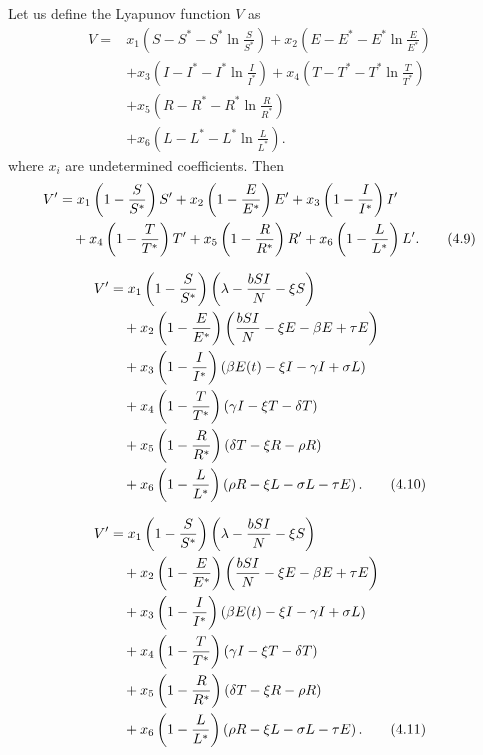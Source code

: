 \documentclass[10pt]{NSP1}
\begin{document}
Let us define the Lyapunov function $V$ as
\begin{equation}
\begin{aligned}
V ={}& x_1 \left( S - S^\ast - S^\ast \ln \frac{S}{S^\ast} \right)
      + x_2 \left( E - E^\ast - E^\ast \ln \frac{E}{E^\ast} \right) \\
& + x_3 \left( I - I^\ast - I^\ast \ln \frac{I}{I^\ast} \right)
  + x_4 \left( T - T^\ast - T^\ast \ln \frac{T}{T^\ast} \right) \\
& + x_5 \left( R - R^\ast - R^\ast \ln \frac{R}{R^\ast} \right) \\
& + x_6 \left( L - L^\ast - L^\ast \ln \frac{L}{L^\ast} \right).
\end{aligned}
\tag{4.8}
\end{equation}
where $x_i$ are undetermined coefficients. Then
\begin{align}
V' &= x_1 \left(1 - \frac{S}{S^*}\right) S' + x_2 \left(1 - \frac{E}{E^*}\right) E' + x_3 \left(1 - \frac{I}{I^*}\right) I' \notag \\
&\quad + x_4 \left(1 - \frac{T}{T^*}\right) T' + x_5 \left(1 - \frac{R}{R^*}\right) R' + x_6 \left(1 - \frac{L}{L^*}\right) L'.
\tag{4.9}
\end{align}

\begin{align}
V' &= x_1 \left(1 - \frac{S}{S^*}\right) \left( \lambda - \frac{b S I}{N} - \xi S \right) \notag \\
&\quad + x_2 \left(1 - \frac{E}{E^*}\right) \left( \frac{b S I}{N} - \xi E - \beta E + \tau E \right) \notag \\
&\quad + x_3 \left(1 - \frac{I}{I^*}\right) \left( \beta E(t) - \xi I - \gamma I + \sigma L \right) \notag \\
&\quad + x_4 \left(1 - \frac{T}{T^*}\right) \left( \gamma I - \xi T - \delta T \right) \notag \\
&\quad + x_5 \left(1 - \frac{R}{R^*}\right) \left( \delta T - \xi R - \rho R \right) \notag \\
&\quad + x_6 \left(1 - \frac{L}{L^*}\right) \left( \rho R - \xi L - \sigma L - \tau E \right).
\tag{4.10}
\end{align}

\begin{align}
V' &= x_1 \left(1 - \frac{S}{S^*}\right) \left( \lambda - \frac{b S I}{N} - \xi S \right) \notag \\
&\quad + x_2 \left(1 - \frac{E}{E^*}\right) \left( \frac{b S I}{N} - \xi E - \beta E + \tau E \right) \notag \\
&\quad + x_3 \left(1 - \frac{I}{I^*}\right) \left( \beta E(t) - \xi I - \gamma I + \sigma L \right) \notag \\
&\quad + x_4 \left(1 - \frac{T}{T^*}\right) \left( \gamma I - \xi T - \delta T \right) \notag \\
&\quad + x_5 \left(1 - \frac{R}{R^*}\right) \left( \delta T - \xi R - \rho R \right) \notag \\
&\quad + x_6 \left(1 - \frac{L}{L^*}\right) \left( \rho R - \xi L - \sigma L - \tau E \right).
\tag{4.11}
\end{align}
\end{document}
